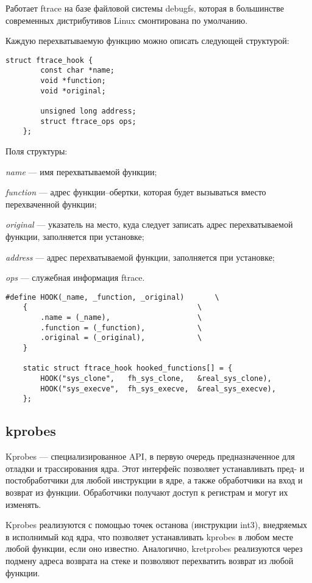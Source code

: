 Работает ftrace на базе файловой системы debugfs, которая в большинстве современных дистрибутивов Linux смонтирована по умолчанию. 

Каждую перехватываемую функцию можно описать следующей структурой:

\begin{lstlisting}[label=code:ftracehook,caption=Структура ftrace\_hook]
	struct ftrace_hook {
		const char *name;
		void *function;
		void *original;
		
		unsigned long address;
		struct ftrace_ops ops;
	};
\end{lstlisting}

Поля структуры:

\textit{name} --- имя перехватываемой функции;

\textit{function} ---  адрес функции--обертки, которая будет вызываться вместо перехваченной функции;

\textit{original} ---  указатель на место, куда следует записать адрес перехватываемой функции, заполняется при установке;

\textit{address} --- адрес перехватываемой функции, заполняется при установке;

\textit{ops} --- служебная информация ftrace.

\begin{lstlisting}[label=code:ftracehookexm,caption=Пример заполнения структуры ftrace\_hook]
	#define HOOK(_name, _function, _original)       \
	{                                       \
		.name = (_name),                    \
		.function = (_function),            \
		.original = (_original),            \
	}
	
	static struct ftrace_hook hooked_functions[] = {
		HOOK("sys_clone",   fh_sys_clone,   &real_sys_clone),
		HOOK("sys_execve",  fh_sys_execve,  &real_sys_execve),
	};
\end{lstlisting}

\subsection{kprobes}

Kprobes --- специализированное API, в первую очередь предназначенное для отладки и трассирования ядра. Этот интерфейс позволяет устанавливать пред- и постобработчики для любой инструкции в ядре, а также обработчики на вход и возврат из функции. Обработчики получают доступ к регистрам и могут их изменять.

Kprobes реализуются с помощью точек останова (инструкции int3), внедряемых в исполнимый код ядра, что позволяет устанавливать kprobes в любом месте любой функции, если оно известно. Аналогично, kretprobes реализуются через подмену адреса возврата на стеке и позволяют перехватить возврат из любой функции.

